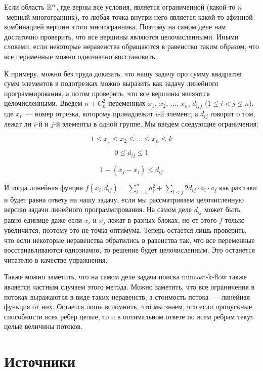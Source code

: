 Если область $\mathbb{R}^n$, где верны все условия, является ограниченной (какой-то $n$-мерный многогранник), то любая точка внутри него является какой-то афинной комбинацией вершин этого многогранника. Поэтому на самом деле нам достаточно проверить, что все вершины являются целочисленными. Иными словами, если некоторые неравенства обращаются в равенство таким образом, что все переменные можно однозначно восстановить.

К примеру, можно без труда доказать, что нашу задачу про сумму квадратов сумм элементов в подотрезках можно выразить как задачу линейного программирования, а потом проверить, что все вершины являются целочисленными. Введем $n + C_n^2$ переменных $x_1$, $x_2$, $\ldots$, $x_n$, $d_{i, j}$ ($1 \le i < j \le n$), где $x_i$~--- номер отрезка, которому принадлежит $i$-й элемент, а $d_{i j}$ говорит о том, лежат ли $i$-й и $j$-й элементы в одной группе. Мы введем следующие ограничения:

$$1 \le x_1 \le x_2 \le \ldots \le x_n \le k$$

$$0 \le d_{i j} \le 1$$

$$1 - (x_j - x_i) \le d_{i j}$$

И тогда линейная фунция $f(x_i, d_{ij}) = \sum_{i = 1}^{n} a_i^2 + \sum_{i < j} 2 d_{i j} \cdot a_i \cdot a_j$ как раз таки и будет равна ответу на нашу задачу, если мы рассматриваем целочисленную версию задачи линейного программирования. На самом деле $d_{i j}$ может быть равно единице даже если $x_i$ и $x_j$ лежат в разных блоках, но от этого $f$ только увеличится, поэтому это не точка оптимума. Теперь остается лишь проверить, что если некоторые неравенства обратились в равенства так, что все переменные восстанавливаются однозначно, то решение будет целочисленным. Это останется читателю в качестве упражнения.

Также можно заметить, что на самом деле задача поиска mincost-k-flow также является частным случаем этого метода. Можно заметить, что все ограничения в потоках выражаются в виде таких неравенств, а стоимость потока~--- линейная функция от них. Остается лишь вспомнить, что мы знаем, что если пропускные способности всех ребер целые, то и в оптимальном ответе по всем ребрам текут целые величины потоков.



\section{Источники}

